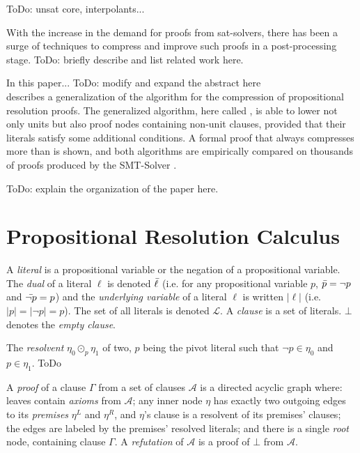 \documentclass{llncs}
\begin{document}
ToDo: unsat core, interpolants...

With the increase in the demand for proofs from sat-solvers, there has been a surge of techniques to compress and improve such proofs in a post-processing stage. ToDo: briefly describe and list related work here.

In this paper...  ToDo: modify and expand the abstract here\\
 describes a generalization of the {\LowerUnits} algorithm \cite{LURPI} for the compression
of propositional resolution proofs. The generalized algorithm, here called {\LowerUnivalents}, is
able to lower not only units but also proof nodes containing non-unit clauses, provided that their
literals satisfy some additional conditions. A formal proof that {\LowerUnivalents} always
compresses more than {\LowerUnits} is shown, and both algorithms are empirically compared on
thousands of proofs produced by the SMT-Solver \veriT.

ToDo: explain the organization of the paper here.


\section{Propositional Resolution Calculus}

A \emph{literal} is a propositional variable or the negation of a propositional variable. The \emph{dual} of a literal $\ell$ is denoted
$\bar{\ell}$ (i.e. for any propositional variable $p$, $\bar{p} =
\neg p$ and $\bar{\neg p} = p$) and the \emph{underlying variable} of a literal
$\ell$ is written $|\ell|$ (i.e. $|p| = |\neg p| = p$). The set of all literals is denoted $\mathcal{L}$. A \emph{clause} is a set of literals. $\bot$ denotes the \emph{empty clause}.


\begin{notation}[Resolvent]
The \emph{resolvent} $\eta_0 \odot_p \eta_1$ of two, $p$ being the pivot
literal such that $\neg p \in \eta_0$ and $p \in \eta_1$. ToDo
\end{notation}

\noindent
A \emph{proof} of a clause $\Gamma$ from a set of clauses $\mathcal{A}$ is a
directed acyclic graph where: leaves contain \emph{axioms} from $\mathcal{A}$;
any inner node $\eta$ has exactly two outgoing edges to its \emph{premises} $\eta^L$ and $\eta^R$, and $\eta$'s clause is a resolvent of its premises' clauses; the edges are labeled by the premises'
resolved literals; and there is a single \emph{root} node, containing clause $\Gamma$. A \emph{refutation} of $\mathcal{A}$ is a proof of $\bot$ from $\mathcal{A}$.
\end{document}
